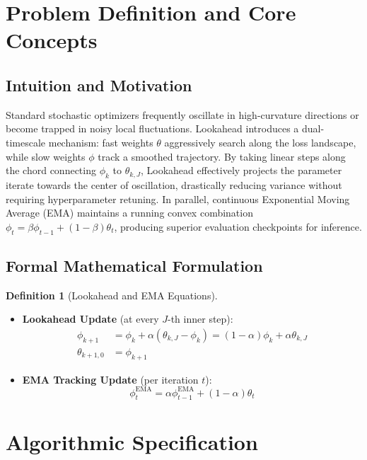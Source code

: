 \documentclass[11pt,a4paper]{article}
\theoremstyle{definition}
\newtheorem{definition}{Definition}[section]
\begin{document}
\section{Problem Definition and Core Concepts}

\subsection{Intuition and Motivation}
Standard stochastic optimizers frequently oscillate in high-curvature directions or become trapped in noisy local fluctuations. Lookahead introduces a dual-timescale mechanism: fast weights $\theta$ aggressively search along the loss landscape, while slow weights $\phi$ track a smoothed trajectory. By taking linear steps along the chord connecting $\phi_k$ to $\theta_{k, J}$, Lookahead effectively projects the parameter iterate towards the center of oscillation, drastically reducing variance without requiring hyperparameter retuning. In parallel, continuous Exponential Moving Average (EMA) maintains a running convex combination $\phi_t = \beta \phi_{t-1} + (1 - \beta) \theta_t$, producing superior evaluation checkpoints for inference.

\subsection{Formal Mathematical Formulation}
\begin{definition}[Lookahead and EMA Equations]
\begin{itemize}
    \item \textbf{Lookahead Update} (at every $J$-th inner step):
    \begin{align}
    \phi_{k+1} &= \phi_k + \alpha (\theta_{k, J} - \phi_k) = (1 - \alpha) \phi_k + \alpha \theta_{k, J} \label{eq:lookahead_step} \\
    \theta_{k+1, 0} &= \phi_{k+1} \label{eq:lookahead_reset}
    \end{align}
    \item \textbf{EMA Tracking Update} (per iteration $t$):
    \begin{equation}
    \phi_t^{\text{EMA}} = \alpha \phi_{t-1}^{\text{EMA}} + (1 - \alpha) \theta_t \label{eq:ema_step}
    \end{equation}
\end{itemize}
\end{definition}

\section{Algorithmic Specification}
\end{document}
